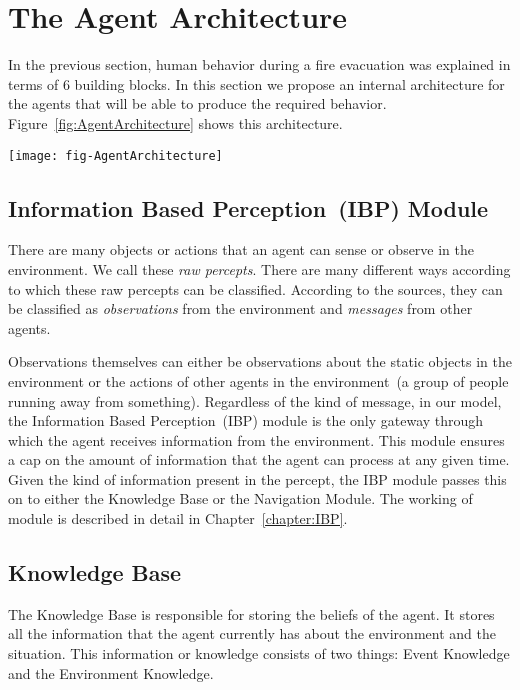 \section{The Agent Architecture}
\label{IBEVAC:AgentArchitecture}
In the previous section, human behavior during a fire evacuation was explained in terms of 6 building blocks. In this section we propose an internal architecture for the agents that will be able to produce the required behavior. Figure~\ref{fig:AgentArchitecture} shows this architecture. 
 
\begin{sidewaysfigure}[!htb]
\centering
\texttt{[image: fig-AgentArchitecture]}
\caption[The Agent Architecture]{An illustrated representation of the agent architecture described in Sect.~\ref{IBEVAC:AgentArchitecture}}
\label{fig:AgentArchitecture}
\end{sidewaysfigure}

\subsection{Information Based Perception~(IBP) Module}
\label{IBEVAC:IBPModule}
There are many objects or actions that an agent can sense or observe in the environment. We call these \emph{raw percepts}. There are many different ways according to which these raw percepts can be classified. According to the sources, they can be classified as \emph{observations} from the environment and \emph{messages} from other agents.

Observations themselves can either be observations about the static objects in the environment or the actions of other agents in the environment~(a group of people running away from something). Regardless of the kind of message, in our model, the Information Based Perception~(IBP) module is the only gateway through which the agent receives information from the environment. This module ensures a cap on the amount of information that the agent can process at any given time. Given the kind of information present in the percept, the IBP module passes this on to either the Knowledge Base or the Navigation Module. The working of module is described in detail in Chapter~\ref{chapter:IBP}.

\subsection{Knowledge Base}
\label{IBEVAC:KnowledgeBase}
The Knowledge Base is responsible for storing the beliefs of the agent. It stores all the information that the agent currently has about the environment and the situation. This information or knowledge consists of two things: Event Knowledge and the Environment Knowledge.

